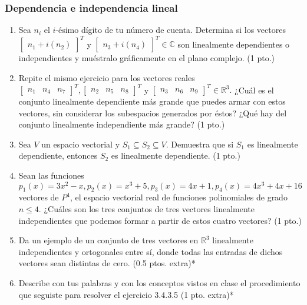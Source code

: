 \documentclass[12pt]{article}
\begin{document}
\subsubsection{Dependencia e independencia lineal}

\begin{enumerate}
    \item Sea $n_i$ el $i$-ésimo dígito de tu número de cuenta. Determina si los vectores $\begin{bmatrix} n_1 + i(n_2) \end{bmatrix}^T$ y $\begin{bmatrix} n_3 + i(n_4) \end{bmatrix}^T \in \mathbb{C}$ son linealmente dependientes o independientes y muéstralo gráficamente en el plano complejo. (1 pto.)
    \item Repite el mismo ejercicio para los vectores reales $\begin{bmatrix} n_1 & n_4 & n_7 \end{bmatrix}^T, \begin{bmatrix} n_2 & n_5 & n_8 \end{bmatrix}^T$ y $\begin{bmatrix} n_3 & n_6 & n_9 \end{bmatrix}^T\in\mathbb{R}^3.$ ¿Cuál es el conjunto linealmente dependiente más grande que puedes armar con estos vectores, sin considerar los subespacios generados por éstos? ¿Qué hay del conjunto linealmente independiente más grande? (1 pto.)
    \item Sea $V$ un espacio vectorial y $S_1\subseteq S_2\subseteq V$. Demuestra que si $S_1$ es linealmente dependiente, entonces $S_2$ es linealmente dependiente. (1 pto.)
    \item Sean las funciones $p_1(x) = 3x^2-x, p_2(x) = x^3+5, p_3(x)=4x+1, p_4(x)=4x^3+4x+16$ vectores de $P^4$, el espacio vectorial real de funciones polinomiales de grado $n\le 4.$ ¿Cuáles son los tres conjuntos de tres vectores linealmente independientes que podemos formar a partir de estos cuatro vectores? (1 pto.) 
    \item Da un ejemplo de un conjunto de tres vectores en $\mathbb{R}^3$ linealmente independientes y ortogonales entre sí, donde todas las entradas de dichos vectores sean distintas de cero. (0.5 ptos. extra)*
    \item Describe con tus palabras y con los conceptos vistos en clase el procedimiento que seguiste para resolver el ejercicio 3.4.3.5 (1 pto. extra)*
    
\end{enumerate}
\end{document}
